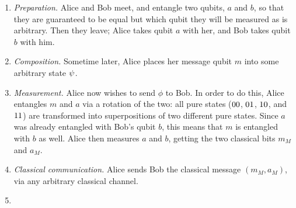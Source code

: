 \documentclass[12pt]{amsart}
\newif\ifdraft
\let\ket\relax
\newcommand{\asz}[1]{\ifdraft\textcolor{violet}{[ASZ: #1]}\fi}
\begin{document}
\begin{enumerate}
  \item \emph{Preparation.} Alice and Bob meet, and entangle two qubits, $a$ and
    $b$, so that they are guaranteed to be equal but which qubit they will be
    measured as is arbitrary.  Then they leave; Alice takes qubit $a$ with her,
    and Bob takes qubit $b$ with him.

  \item \emph{Composition.}  Sometime later, Alice places her message qubit $m$
    into some arbitrary state $\ket{\psi}$.\asz{I \emph{think} kets aren't only
    used for pure states.}

  \item \emph{Measurement.}  Alice now wishes to send $\phi$ to Bob.  In order
    to do this, Alice entangles $m$ and $a$ via a rotation\asz{check this
    terminology} of the two: all pure states ($\ket{00}$, $\ket{01}$,
    $\ket{10}$, and $\ket{11}$) are transformed into superpositions of two
    different pure states.  Since $a$ was already entangled with Bob's qubit
    $b$, this means that $m$ is entangled with $b$ as well.\asz{Should we split
    this next off into a separate step?}  Alice then measures $a$ and $b$,
    getting the two classical bits $m_M$ and $a_M$.

  \item \emph{Classical communication.}  Alice sends Bob the classical message
    $(m_M,a_M)$, via any arbitrary classical channel.

  \item \asz{I decided this isn't clear without the details.  Maybe I'll try
    explaining this to random victims -- er, friends -- and see how clear I can
    make it.}
\end{enumerate}
\end{document}
